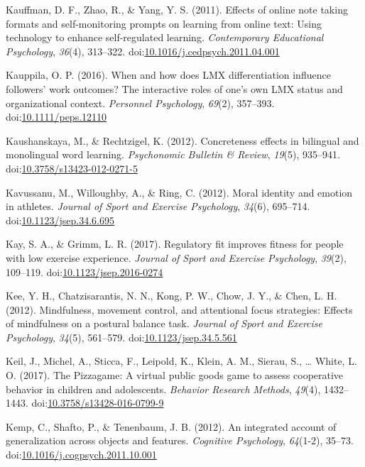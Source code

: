 \documentclass[english,man]{apa6}
\theoremstyle{definition}
\theoremstyle{definition}
\theoremstyle{definition}
\theoremstyle{remark}
\begin{document}
\hypertarget{ref-Kauffman2011}{}
Kauffman, D. F., Zhao, R., \& Yang, Y. S. (2011). Effects of online note
taking formats and self-monitoring prompts on learning from online text:
Using technology to enhance self-regulated learning. \emph{Contemporary
Educational Psychology}, \emph{36}(4), 313--322.
doi:\href{https://doi.org/10.1016/j.cedpsych.2011.04.001}{10.1016/j.cedpsych.2011.04.001}

\hypertarget{ref-Kauppila2016}{}
Kauppila, O. P. (2016). When and how does LMX differentiation influence
followers' work outcomes? The interactive roles of one's own LMX status
and organizational context. \emph{Personnel Psychology}, \emph{69}(2),
357--393.
doi:\href{https://doi.org/10.1111/peps.12110}{10.1111/peps.12110}

\hypertarget{ref-Kaushanskaya2012}{}
Kaushanskaya, M., \& Rechtzigel, K. (2012). Concreteness effects in
bilingual and monolingual word learning. \emph{Psychonomic Bulletin \&
Review}, \emph{19}(5), 935--941.
doi:\href{https://doi.org/10.3758/s13423-012-0271-5}{10.3758/s13423-012-0271-5}

\hypertarget{ref-Kavussanu2012}{}
Kavussanu, M., Willoughby, A., \& Ring, C. (2012). Moral identity and
emotion in athletes. \emph{Journal of Sport and Exercise Psychology},
\emph{34}(6), 695--714.
doi:\href{https://doi.org/10.1123/jsep.34.6.695}{10.1123/jsep.34.6.695}

\hypertarget{ref-Kay2017}{}
Kay, S. A., \& Grimm, L. R. (2017). Regulatory fit improves fitness for
people with low exercise experience. \emph{Journal of Sport and Exercise
Psychology}, \emph{39}(2), 109--119.
doi:\href{https://doi.org/10.1123/jsep.2016-0274}{10.1123/jsep.2016-0274}

\hypertarget{ref-Kee2012}{}
Kee, Y. H., Chatzisarantis, N. N., Kong, P. W., Chow, J. Y., \& Chen, L.
H. (2012). Mindfulness, movement control, and attentional focus
strategies: Effects of mindfulness on a postural balance task.
\emph{Journal of Sport and Exercise Psychology}, \emph{34}(5), 561--579.
doi:\href{https://doi.org/10.1123/jsep.34.5.561}{10.1123/jsep.34.5.561}

\hypertarget{ref-Keil2017}{}
Keil, J., Michel, A., Sticca, F., Leipold, K., Klein, A. M., Sierau, S.,
\ldots{} White, L. O. (2017). The Pizzagame: A virtual public goods game
to assess cooperative behavior in children and adolescents.
\emph{Behavior Research Methods}, \emph{49}(4), 1432--1443.
doi:\href{https://doi.org/10.3758/s13428-016-0799-9}{10.3758/s13428-016-0799-9}

\hypertarget{ref-Kemp2012}{}
Kemp, C., Shafto, P., \& Tenenbaum, J. B. (2012). An integrated account
of generalization across objects and features. \emph{Cognitive
Psychology}, \emph{64}(1-2), 35--73.
doi:\href{https://doi.org/10.1016/j.cogpsych.2011.10.001}{10.1016/j.cogpsych.2011.10.001}
\end{document}
